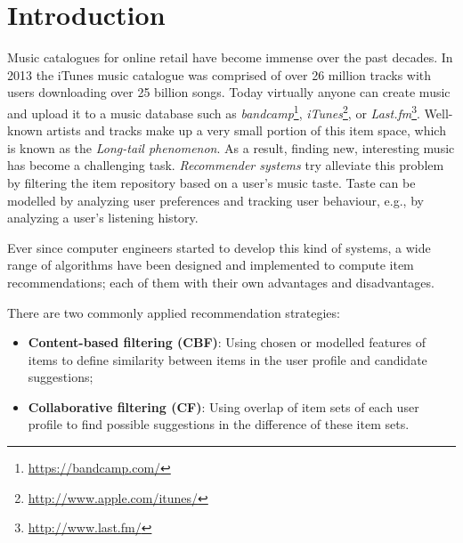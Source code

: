 \chapter{Introduction}\label{chapter:introduction}


Music catalogues for online retail have become immense over the past decades. In 2013 the iTunes music catalogue was comprised of over 26 million tracks with users downloading over 25 billion songs\cite{itunes:2013:sales}. Today virtually anyone can create music and upload it to a music database such as \emph{bandcamp}\footnote{\url{https://bandcamp.com/}}, \emph{iTunes}\footnote{\url{http://www.apple.com/itunes/}}, or \emph{Last.fm}\footnote{\url{http://www.last.fm/}}\cite{bandcamp:2013:artists, itunes:2013:sales, lastfm:2012:home}. Well-known artists and tracks make up a very small portion of this item space, which is known as the \emph{Long-tail phenomenon}\cite{levy:2010}. As a result, finding new, interesting music has become a challenging task. \emph{Recommender systems} try alleviate this problem by filtering the item repository based on a user's music taste. Taste can be modelled by analyzing user preferences and tracking user behaviour, e.g., by analyzing a user's listening history\cite{lastfm:2012:home}.

Ever since computer engineers started to develop this kind of systems, a wide range of algorithms have been designed and implemented to compute item recommendations\cite{burke:2002, melville:2002:CCF:777092.777124, pazzani:2007:CRS:1768197.1768209, rajaraman:2012}; each of them with their own advantages and disadvantages.

There are two commonly applied recommendation strategies\cite{rajaraman:2012}:

\begin{itemize}
	\item \textbf{Content-based filtering (CBF)}: Using chosen or modelled features of items to define similarity between items in the user profile and candidate suggestions;
	\item \textbf{Collaborative filtering (CF)}: Using overlap of item sets of each user profile to find possible suggestions in the difference of these item sets.
\end{itemize}

